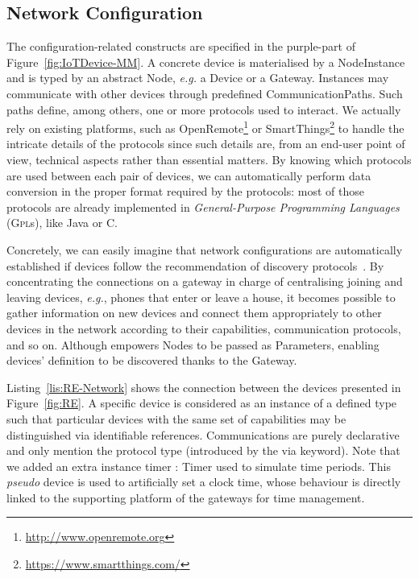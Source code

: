 \subsection{Network Configuration}
\label{sec:IoTDSL-NetworkConfiguration}

The configuration-related constructs are specified in the purple-part of Figure~\ref{fig:IoTDevice-MM}. A concrete device is materialised by a \textsf{NodeInstance} and is typed by an abstract \textsf{Node}, \textit{e.g.} a \textsf{Device} or a \textsf{Gateway}. Instances may communicate with other \IOT devices through predefined \textsf{CommunicationPath}s. Such paths define, among others, one or more protocols used to interact. We actually rely on existing platforms, such as OpenRemote\footnote{\url{http://www.openremote.org}} or SmartThings\footnote{\url{https://www.smartthings.com/}} to handle the intricate details of the protocols since such details are, from an end-user point of view, technical aspects rather than essential matters. By knowing which protocols are used between each pair of devices, we can automatically perform data conversion in the proper format required by the protocols: most of those protocols are already implemented in \textit{General-Purpose Programming Languages} (\textsc{Gpl}s), like Java or C.

Concretely, we can easily imagine that network configurations are automatically established if devices follow the recommendation of discovery protocols~\cite{alfuqaha-15}. By concentrating the connections on a gateway in charge of centralising joining and leaving devices, \textit{e.g.}, phones that enter or leave a house, it becomes possible to gather information on new devices and connect them appropriately to other devices in the network according to their capabilities, communication protocols, and so on. Although \IOTDSL empowers \textsf{Node}s to be passed as \textsf{Parameter}s, enabling devices' definition to be discovered thanks to the \textsf{Gateway}.

Listing~\ref{lis:RE-Network} shows the connection between the devices presented in Figure~\ref{fig:RE}. A specific device is considered as an instance of a defined type such that particular devices with the same set of capabilities may be distinguished via identifiable references. Communications are purely declarative and only mention the protocol type (introduced by the \textsf{via} keyword). Note that we added an extra instance \textsf{timer : Timer} used to simulate time periods. This \textit{pseudo} device is used to artificially set a clock time, whose behaviour is directly linked to the supporting platform of the gateways for time management.
	
